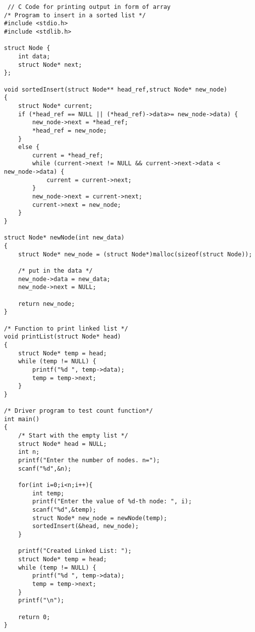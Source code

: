\documentclass[journal,12pt,twocolumn]{IEEEtran}
\begin{document}
 \begin{lstlisting}
 // C Code for printing output in form of array
/* Program to insert in a sorted list */
#include <stdio.h>
#include <stdlib.h>

struct Node {
	int data;
	struct Node* next;
};

void sortedInsert(struct Node** head_ref,struct Node* new_node)
{
	struct Node* current;
	if (*head_ref == NULL || (*head_ref)->data>= new_node->data) {
		new_node->next = *head_ref;
		*head_ref = new_node;
	}
	else {
		current = *head_ref;
		while (current->next != NULL && current->next->data < new_node->data) {
			current = current->next;
		}
		new_node->next = current->next;
		current->next = new_node;
	}
}

struct Node* newNode(int new_data)
{
	struct Node* new_node = (struct Node*)malloc(sizeof(struct Node));

	/* put in the data */
	new_node->data = new_data;
	new_node->next = NULL;

	return new_node;
}

/* Function to print linked list */
void printList(struct Node* head)
{
	struct Node* temp = head;
	while (temp != NULL) {
		printf("%d ", temp->data);
		temp = temp->next;
	}
}

/* Driver program to test count function*/
int main()
{
	/* Start with the empty list */
	struct Node* head = NULL;
	int n;
	printf("Enter the number of nodes. n=");
	scanf("%d",&n);

	for(int i=0;i<n;i++){
		int temp;
		printf("Enter the value of %d-th node: ", i);
		scanf("%d",&temp);
		struct Node* new_node = newNode(temp);
		sortedInsert(&head, new_node);
	}

	printf("Created Linked List: ");
	struct Node* temp = head;
	while (temp != NULL) {
		printf("%d ", temp->data);
		temp = temp->next;
	}
	printf("\n");

	return 0;
}
\end{lstlisting}
\end{document}
